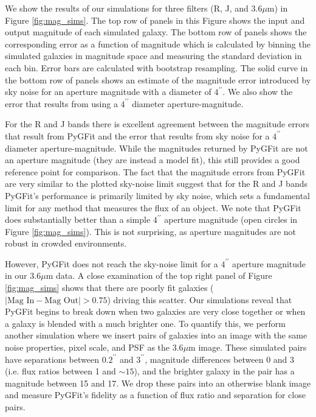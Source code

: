 \documentclass[preprint]{aastex}
\newcommand{\pygfit}{PyGFit}
\begin{document}
We show the results of our simulations for three filters (R, J, and $3.6\mu$m) in Figure \ref{fig:mag_sims}.  The top row of panels in this Figure shows the input and output magnitude of each simulated galaxy.  The bottom row of panels shows the corresponding error as a function of magnitude which is calculated by binning the simulated galaxies in magnitude space and measuring the standard deviation in each bin.  Error bars are calculated with bootstrap resampling.  The solid curve in the bottom row of panels shows an estimate of the magnitude error introduced by sky noise for an aperture magnitude with a diameter of $4^{\prime\prime}$.  We also show the error that results from using a $4^{\prime\prime}$ diameter aperture-magnitude.


For the R and J bands there is excellent agreement between the magnitude errors that result from \pygfit{} and the error that results from sky noise for a $4^{\prime\prime}$ diameter aperture-magnitude.  While the magnitudes returned by \pygfit{} are not an aperture magnitude (they are instead a model fit), this still provides a good reference point for comparison.  The fact that the magnitude errors from \pygfit{} are very similar to the plotted sky-noise limit suggest that for the R and J bands \pygfit{}'s performance is primarily limited by sky noise, which sets a fundamental limit for any method that measures the flux of an object.  We note that \pygfit{} does substantially better than a simple $4^{\prime\prime}$ aperture magnitude (open circles in Figure \ref{fig:mag_sims}).  This is not surprising, as aperture magnitudes are not robust in crowded environments.

However, \pygfit{} does not reach the sky-noise limit for a $4^{\prime\prime}$ aperture magnitude in our $3.6\mu$m data.  A close examination of the top right panel of Figure \ref{fig:mag_sims} shows that there are poorly fit galaxies ($|\textrm{Mag In} - \textrm{Mag Out}| > 0.75$) driving this scatter.  Our simulations reveal that \pygfit{} begins to break down when two galaxies are very close together or when a galaxy is blended with a much brighter one.  To quantify this, we perform another simulation where we insert pairs of galaxies into an image with the same noise properties, pixel scale, and PSF as the $3.6\mu$m image.  These simulated pairs have separations between $0.2^{\prime\prime}$ and $3^{\prime\prime}$, magnitude differences between 0 and 3 (i.e. flux ratios between 1 and $\sim15$), and the brighter galaxy in the pair has a magnitude between 15 and 17.  We drop these pairs into an otherwise blank image and measure \pygfit{}'s fidelity as a function of flux ratio and separation for close pairs.
\end{document}
